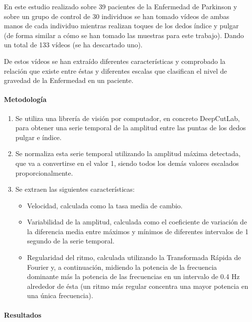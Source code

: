 En este estudio \cite{williams2020discerning} realizado sobre 39 pacientes de la
Enfermedad de Parkinson y sobre un grupo de control de 30 individuos se han
tomado vídeos de ambas manos de cada individuo mientras realizan toques de los
dedos índice y pulgar (de forma similar a cómo se han tomado las muestras para
este trabajo). Dando un total de 133 vídeos (se ha descartado uno).

De estos vídeos se han extraído diferentes características y comprobado la
relación que existe entre éstas y diferentes escalas que clasifican el nivel de
gravedad de la Enfermedad en un paciente.


\paragraph{Metodología}

\begin{enumerate}
    \item Se utiliza una librería de visión por computador, en concreto
          DeepCutLab, para obtener una serie temporal de la amplitud entre las
          puntas de los dedos pulgar e índice.
    \item Se normaliza esta serie temporal utilizando la amplitud máxima
          detectada, que va a convertirse en el valor 1, siendo todos los demás
          valores escalados proporcionalmente.
    \item Se extraen las siguientes características:
          \begin{itemize}
              \item Velocidad, calculada como la tasa media de cambio.
              \item Variabilidad de la amplitud, calculada como el coeficiente
                    de variación de la diferencia media entre máximos y mínimos
                    de diferentes intervalos de 1 segundo de la serie temporal.
              \item Regularidad del ritmo, calculada utilizando la Transformada
                    Rápida de Fourier y, a continuación, midiendo la potencia de
                    la frecuencia dominante más la potencia de las frecuencias
                    en un intervalo de 0.4 Hz alrededor de ésta (un ritmo más
                    regular concentra una mayor potencia en una única
                    frecuencia).
          \end{itemize}
\end{enumerate}


\paragraph{Resultados}


